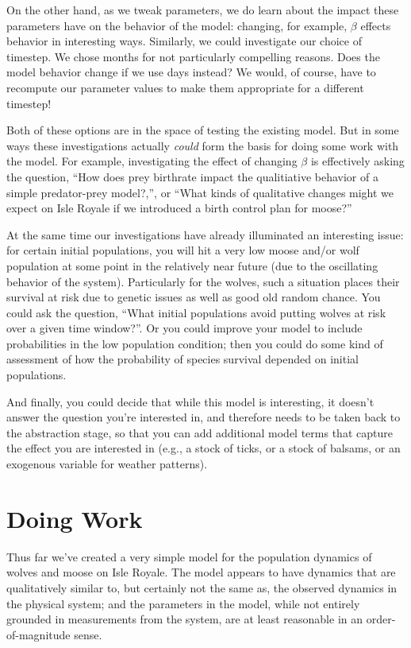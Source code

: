 On the other hand, as we tweak parameters, we do learn about the impact these parameters have on the behavior of the model: changing, for example, $\beta$ effects behavior in interesting ways.  Similarly, 
we could investigate our choice of timestep.  We chose months for not particularly compelling reasons.  Does the model behavior change if we use days instead?  We would, of course, have to recompute our parameter values to make them appropriate for a different timestep!

Both of these options are in the space of testing the existing model.  But in some ways these investigations actually {\it could} form the basis for doing some work with the model.  For example, investigating the effect of changing $\beta$ is effectively asking the question, ``How does prey birthrate impact the qualitiative behavior of a simple predator-prey model?,'', or ``What kinds of qualitative changes might we expect on Isle Royale if we introduced a birth control plan for moose?''

At the same time our investigations have already illuminated an interesting issue:  for certain initial populations, you will hit a very low moose and/or wolf population at some point in the relatively near future (due to the oscillating behavior of the system).  Particularly for the wolves, such a situation places their survival at risk due to genetic issues as well as good old random chance.  You could ask the question, ``What initial populations avoid putting wolves at risk over a given time window?''.  Or you could improve your model to include probabilities in the low population condition; then you could do some kind of assessment of how the probability of species survival depended on initial populations.

And finally, you could decide that while this model is interesting, it doesn't answer the question you're interested in, and therefore needs to be taken back to the abstraction stage, so that you can add additional model terms that capture the effect you are interested in (e.g., a stock of ticks, or a stock of balsams, or an exogenous variable for weather patterns).  

\section{Doing Work}

Thus far we've created a very simple model for the population dynamics of wolves and moose on Isle Royale.  The model appears to have dynamics that are qualitatively similar to, but certainly not the same as, the observed dynamics in the physical system; and the parameters in the model, while not entirely grounded in measurements from the system, are at least reasonable in an order-of-magnitude sense.  

